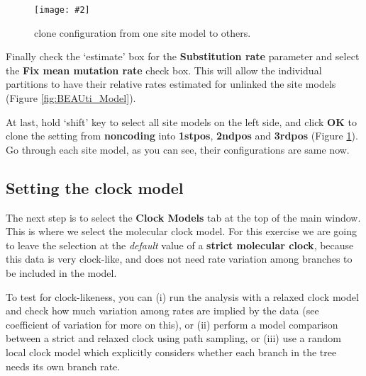 \documentclass[12pt]{article}
\newcommand{\includeimage}[2][]{%
\texttt{[image: \#2]}
}
\begin{document}
\begin{figure}
\centering	
\includeimage[width=0.9\textwidth]{figures/cloneFrom}
\caption{clone configuration from one site model to others.}
\label{fig:cloneFrom}
\end{figure}

Finally check the `estimate' box for the \textbf{Substitution rate} parameter and select the \textbf{Fix mean mutation rate} check box. This will allow the individual partitions to have their relative rates estimated for unlinked the site models (Figure \ref{fig:BEAUti_Model}).


At last, hold `shift' key to select all site models on the left side, and click \textbf{OK} to clone the setting from \textbf{noncoding} into \textbf{1stpos}, \textbf{2ndpos} and \textbf{3rdpos} (Figure \ref{fig:cloneFrom}). Go through each site model, as you can see, their configurations are same now. 


\subsection{Setting the clock model}

The next step is to select the {\bf Clock Models} tab at the top of the
main window. This is where we select the molecular clock model. For this exercise we are going to leave the selection at the {\it default} value of a \textbf{strict molecular clock}, because this data is very clock-like, and does not need rate variation among branches to be included in the model.

To test for clock-likeness, you can (i) run the analysis with
a relaxed clock model and check how much variation among rates are implied
by the data (see coefficient of variation for more on this), or
(ii) perform a model comparison between a strict and relaxed clock using path
sampling, or (iii) use a random local clock model \cite{drummond2010bayesian}
which explicitly considers whether each branch in the tree needs its own branch
rate.

\end{document}
